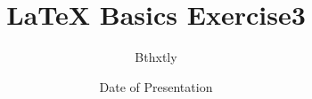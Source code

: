 \documentclass{beamer}
\title{LaTeX Basics Exercise3}
\author{Bthxtly}
\institute{NEUQ}
\date{Date of Presentation}
\begin{document}
\begin{frame}
\titlepage{} %
\end{frame}
\end{document}
